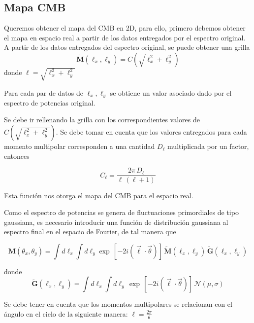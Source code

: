 \documentclass[twocolumn,letterpaper,spanish]{revtex4}
\numberwithin{equation}{section}
\begin{document}
\subsection{Mapa CMB}\label{mapa}

Queremos obtener el mapa del CMB en 2D, para ello, primero debemos obtener el mapa en espacio real a partir de los datos entregados por el espectro original.
A partir de los datos entregados del espectro original, se puede obtener una grilla 
\begin{equation}
\tilde{\mathbf{M}}(\ell_x,\ell_y)=C\left(\sqrt{\ell_x^2 + \ell_y^2}\right)
\end{equation}
donde $\ell=\sqrt{\ell_x^2 + \ell_y^2}$

Para cada par de datos de $\ell_x, \ell_y$ se obtiene un valor asociado dado por el espectro de potencias original.

Se debe ir rellenando la grilla con los correspondientes valores de $C(\sqrt{\ell_x^2 + \ell_y^2})$. Se debe tomar en cuenta que los valores entregados para cada momento multipolar corresponden a una cantidad $D_{\ell}$ multiplicada por un factor, entonces

\begin{equation}
C_{\ell} = \frac{2\pi\,D_{\ell}}{\ell\,(\ell+1)}
\end{equation}

Esta funci\'on nos otorga el mapa del CMB para el espacio real.

Como el espectro de potencias se genera de fluctuaciones primordiales de tipo gaussiana, es necesario introducir una funci\'on de distribuci\'on gaussiana al espectro final en el espacio de Fourier, de tal manera que

\begin{equation}
\mathbf{M}\left(\theta_{x}, \theta_{y}\right)=\int d \ell_{x} \int d \ell_{y} \exp \,[-2 i(\vec{\ell} \cdot \vec{\theta})] \,\tilde{\mathbf{M}}\left(\ell_{x}, \ell_{y}\right)\, \tilde{\mathbf{G}}\left(\ell_{x}, \ell_{y}\right)
\end{equation}

donde 
\begin{equation}
\tilde{\mathbf{G}}\left(\ell_{x}, \ell_{y}\right)=\int d \ell_{x} \int d \ell_{y} \,\exp\, [-2 i(\vec{\ell} \cdot \vec{\theta})] \,\mathcal{N}(\mu, \sigma)
\end{equation}

Se debe tener en cuenta que los momentos multipolares se relacionan con el \'angulo en el cielo de la siguiente manera: $\ell=\frac{2\pi}{\theta}$
\end{document}
